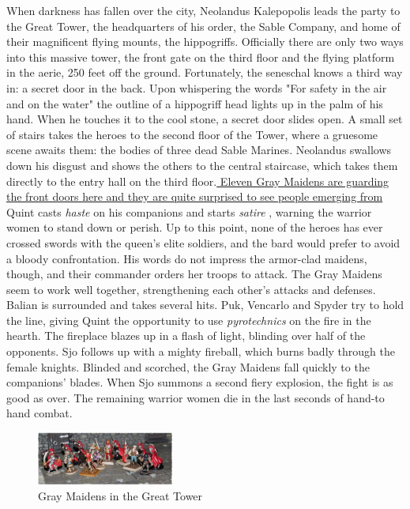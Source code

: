 When darkness has fallen over the city, Neolandus Kalepopolis leads the party to the Great Tower, the headquarters of his order, the Sable Company, and home of their magnificent flying mounts, the hippogriffs. Officially there are only two ways into this massive tower, the front gate on the third floor and the flying platform in the aerie, 250 feet off the ground. Fortunately, the seneschal knows a third way in: a secret door in the back. Upon whispering the words "For safety in the air and on the water" the outline of a hippogriff head lights up in the palm of his hand. When he touches it to the cool stone, a secret door slides open. A small set of stairs takes the heroes to the second floor of the Tower, where a gruesome scene awaits them: the bodies of three dead Sable Marines. Neolandus swallows down his disgust and shows the others to the central staircase, which takes them directly to the entry hall on the third floor.\hyperref[fig:Gray-Maidens-in-the-Great-Tower-567993387]{ Eleven Gray Maidens are guarding the front doors here and they are quite surprised to see people emerging from } Quint casts  {\itshape haste} on his companions and starts  {\itshape satire} , warning the warrior women to stand down or perish. Up to this point, none of the heroes has ever crossed swords with the queen's elite soldiers, and the bard would prefer to avoid a bloody confrontation. His words do not impress the armor-clad maidens, though, and their commander orders her troops to attack. The Gray Maidens seem to work well together, strengthening each other's attacks and defenses. Balian is surrounded and takes several hits. Puk, Vencarlo and Spyder try to hold the line, giving Quint the opportunity to use  {\itshape pyrotechnics} on the fire in the hearth. The fireplace blazes up in a flash of light, blinding over half of the opponents. Sjo follows up with a mighty fireball, which burns badly through the female knights. Blinded and scorched, the Gray Maidens fall quickly to the companions' blades. When Sjo summons a second fiery explosion, the fight is as good as over. The remaining warrior women die in the last seconds of hand-to hand combat. \\

\begin{figure}[h]
	\centering
	\includegraphics[width=0.4\textwidth]{images/Gray-Maidens-in-the-Great-Tower-567993387_mod.jpg}
	\caption{Gray Maidens in the Great Tower}
	\label{fig:Gray-Maidens-in-the-Great-Tower-567993387}
\end{figure}

